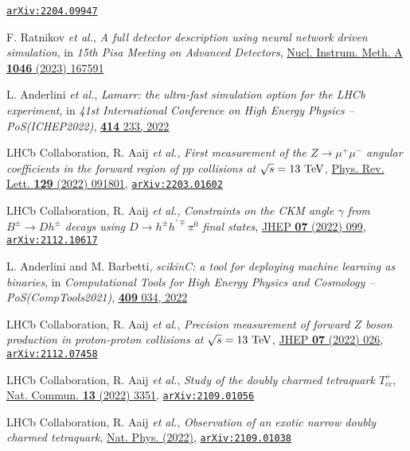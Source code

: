 \documentclass[a4paper, 11pt]{article}
\newenvironment{cvcontent}{
  \leftskip=0.5cm\rightskip=0cm
  \noindent\ignorespaces}{\par}
\newcommand{\arxiv}[1]{\href{https://arxiv.org/abs/#1}{\texttt{arXiv:#1}}}
\begin{document}
\begin{cvcontent}
\begin{enumerate}[label={[\arabic*]}, leftmargin=1.5cm]
    \arxiv{2204.09947}
    \item F. Ratnikov \emph{et al.},
    \emph{A full detector description using neural network driven simulation},
    in \emph{15th Pisa Meeting on Advanced Detectors},
    \href{https://doi.org/10.1016/j.nima.2022.167591}{Nucl. Instrum. Meth. A \textbf{1046} (2023) 167591}
    \item L. Anderlini \emph{et al.},
    \emph{Lamarr: the ultra-fast simulation option for the LHCb experiment},
    in \emph{41st International Conference on High Energy Physics -- PoS(ICHEP2022)},
    \href{https://doi.org/10.22323/1.414.0233}{\textbf{414} 233, 2022}
    \item LHCb Collaboration, R. Aaij \emph{et al.},
    \emph{First measurement of the $Z\rightarrow \mu^+ \mu^-$ angular coefficients in the forward region of $pp$ collisions at $\sqrt{s}=13~\rm{TeV}$},
    \href{https://link.aps.org/doi/10.1103/PhysRevLett.129.091801}{Phys. Rev. Lett. \textbf{129} (2022) 091801},
    \arxiv{2203.01602}
    \item LHCb Collaboration, R. Aaij \emph{et al.}, 
    \emph{Constraints on the CKM angle $\gamma$ from $B^\pm \rightarrow Dh^\pm$ decays using $D \rightarrow h^\pm h^{\prime\mp}\pi^0$ final states},
    \href{https://doi.org/10.1007/JHEP07(2022)099}{JHEP \textbf{07} (2022) 099},
    \arxiv{2112.10617}
    \item L. Anderlini and M. Barbetti, 
    \emph{scikinC: a tool for deploying machine learning as binaries}, 
    in \emph{Computational Tools for High Energy Physics and Cosmology -- PoS(CompTools2021)}, 
    \href{https://doi.org/10.22323/1.409.0034}{\textbf{409} 034, 2022}
    \item LHCb Collaboration, R. Aaij \emph{et al.}, 
    \emph{Precision measurement of forward $Z$ boson production in proton-proton collisions at $\sqrt{s} = 13~\rm{TeV}$},
    \href{https://doi.org/10.1007/JHEP07(2022)026}{JHEP \textbf{07} (2022) 026},
    \arxiv{2112.07458}
    \item LHCb Collaboration, R. Aaij \emph{et al.}, 
    \emph{Study of the doubly charmed tetraquark $T_{cc}^+$},
    \href{https://doi.org/10.1038/s41467-022-30206-w}{Nat. Commun. \textbf{13} (2022) 3351},
    \arxiv{2109.01056}
    \item LHCb Collaboration, R. Aaij \emph{et al.}, 
    \emph{Observation of an exotic narrow doubly charmed tetraquark},
    \href{https://doi.org/10.1038/s41567-022-01614-y}{Nat. Phys. (2022)},
    \arxiv{2109.01038}

\end{enumerate}
\end{cvcontent}
\end{document}
